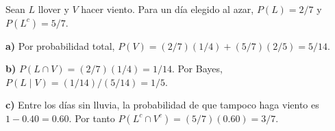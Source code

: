 Sean $L$ llover y $V$ hacer viento. Para un día elegido al
azar, $P(L)=2/7$ y $P(L^c)=5/7$.

\textbf{a)} Por probabilidad total,
$P(V)=(2/7)(1/4)+(5/7)(2/5)=\boxed{5/14}$.

\textbf{b)} $P(L\cap V)=(2/7)(1/4)=1/14$.
Por Bayes, $P(L\mid V)=(1/14)/(5/14)=\boxed{1/5}$.

\textbf{c)} Entre los días sin lluvia, la probabilidad de que
tampoco haga viento es $1-0.40=0.60$. Por tanto
$P(L^c\cap V^c)=(5/7)(0.60)=\boxed{3/7}$.
